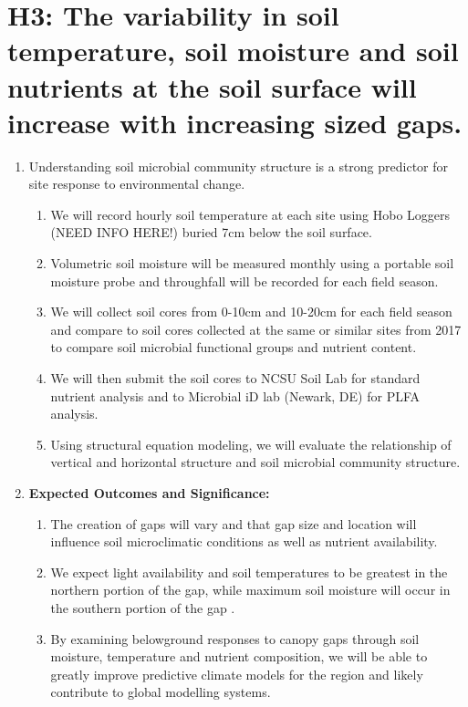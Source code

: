 \documentclass{article}\usepackage[]{graphicx}\usepackage[]{color}
\begin{document}
\section*{ \textbf{H3: The variability in soil temperature, soil moisture and soil nutrients at the soil surface will increase with increasing sized gaps.}}
\begin{enumerate}
\item Understanding soil microbial community structure is a strong predictor for site response to environmental change.
  \begin{enumerate}
  \item We will record hourly soil temperature at each site using Hobo Loggers (NEED INFO HERE!) buried 7cm below the soil surface. 
  \item Volumetric soil moisture will be measured monthly using a portable soil moisture probe and throughfall will be recorded for each field season. 
  \item We will collect soil cores from 0-10cm and 10-20cm for each field season and compare to soil cores collected at the same or similar sites from 2017 to compare soil microbial functional groups and nutrient content.
  \item We will then submit the soil cores to NCSU Soil Lab for standard nutrient analysis and to Microbial iD lab (Newark, DE) for PLFA analysis. 
  \item Using structural equation modeling, we will evaluate the relationship of vertical and horizontal structure and soil microbial community structure.
  \end{enumerate}
  
\item \textbf{Expected Outcomes and Significance:}
  \begin{enumerate}
  \item The creation of gaps will vary and that gap size and location will influence soil microclimatic conditions as well as nutrient availability.
  \item We expect light availability and soil temperatures to be greatest in the northern portion of the gap, while maximum soil moisture will occur in the southern portion of the gap \citep{Schatz2012, Raymond2006}.
  \item By examining belowground responses to canopy gaps through soil moisture, temperature and nutrient composition, we will be able to greatly improve predictive climate models for the region and likely contribute to global modelling systems. 
  \end{enumerate}
\end{enumerate}
\end{document}
